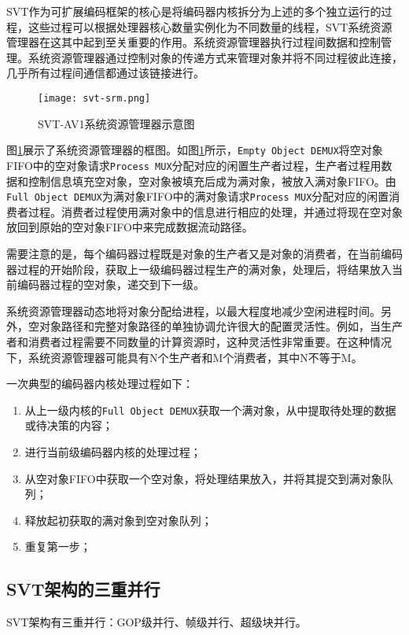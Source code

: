   SVT作为可扩展编码框架的核心是将编码器内核拆分为上述的多个独立运行的过程，这些过程可以根据处理器核心数量实例化为不同数量的线程，SVT系统资源管理器在这其中起到至关重要的作用。系统资源管理器执行过程间数据和控制管理。系统资源管理器通过控制对象的传递方式来管理对象并将不同过程彼此连接，几乎所有过程间通信都通过该链接进行。

  \begin{figure}[!htp]
    \centering
    \texttt{[image: svt-srm.png]}
    \caption{SVT-AV1系统资源管理器示意图}
  \label{fig:svt-srm}
  \end{figure}

  图\ref{fig:svt-srm}展示了系统资源管理器的框图。如图\ref{fig:svt-srm}所示，\texttt{Empty Object DEMUX}将空对象FIFO中的空对象请求\texttt{Process MUX}分配对应的闲置生产者过程，生产者过程用数据和控制信息填充空对象，空对象被填充后成为满对象，被放入满对象FIFO。由\texttt{Full Object DEMUX}为满对象FIFO中的满对象请求\texttt{Process MUX}分配对应的闲置消费者过程。消费者过程使用满对象中的信息进行相应的处理，并通过将现在空对象放回到原始的空对象FIFO中来完成数据流动路径。

  需要注意的是，每个编码器过程既是对象的生产者又是对象的消费者，在当前编码器过程的开始阶段，获取上一级编码器过程生产的满对象，处理后，将结果放入当前编码器过程的空对象，递交到下一级。

  系统资源管理器动态地将对象分配给进程，以最大程度地减少空闲进程时间。另外，空对象路径和完整对象路径的单独协调允许很大的配置灵活性。例如，当生产者和消费者过程需要不同数量的计算资源时，这种灵活性非常重要。在这种情况下，系统资源管理器可能具有N个生产者和M个消费者，其中N不等于M。

  一次典型的编码器内核处理过程如下：
  \begin{enumerate} [label=\arabic*)]
    \item 从上一级内核的\texttt{Full Object DEMUX}获取一个满对象，从中提取待处理的数据或待决策的内容；
    \item 进行当前级编码器内核的处理过程；
    \item 从空对象FIFO中获取一个空对象，将处理结果放入，并将其提交到满对象队列；
    \item 释放起初获取的满对象到空对象队列；
    \item 重复第一步；
  \end{enumerate}

  \subsection{SVT架构的三重并行}
  SVT架构有三重并行：GOP级并行、帧级并行、超级块并行。
